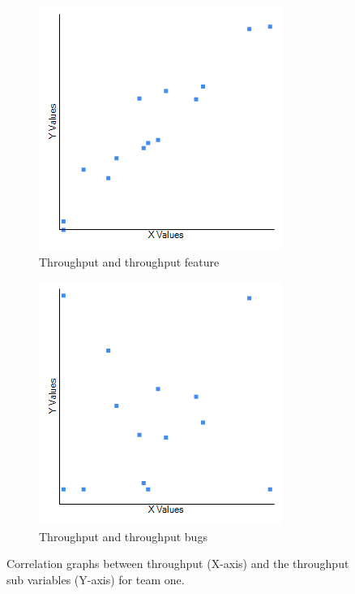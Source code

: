 \documentclass[UKenglish]{ifimaster}  %
\begin{document}
\begin{minipage}[t]{\linewidth}
\begin{figure}[H] 
  \begin{subfigure}[b]{0.5\textwidth}
  \center
\includegraphics[scale=0.6]{Picture/One/TPvsTPFT.png}
 \caption{Throughput and throughput feature} 
 \label{fig:a:1}
  \end{subfigure}
  \begin{subfigure}[b]{0.5\textwidth}
    \center
\includegraphics[scale=0.6]{Picture/One/TPvsTPB.png}
 \caption{Throughput and throughput bugs} 
\label{fig:b:1}
  \end{subfigure}
\caption{Correlation graphs between throughput (X-axis) and the throughput sub variables (Y-axis) for team one.}
\label{corr:Difference:1}
\end{figure}
\end{minipage}
\end{document}
